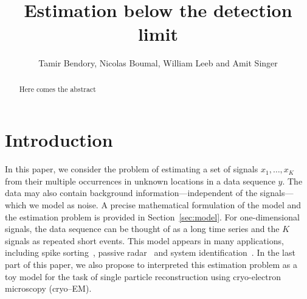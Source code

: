\documentclass[english,11pt]{article}
\newcommand{\TODO}[1]{{\color{red}{[#1]}}}
\numberwithin{equation}{section}
\theoremstyle{plain}
\theoremstyle{definition}
\theoremstyle{remark}
\theoremstyle{plain}
\theoremstyle{remark}
\theoremstyle{plain}
\theoremstyle{plain}
\begin{document}
\title{Estimation below the detection limit}


\author{Tamir Bendory, Nicolas Boumal, William Leeb and Amit Singer}
\maketitle

\begin{abstract}
	Here comes the abstract
\end{abstract}

\section{Introduction}

In this paper, we consider the problem of estimating a set of signals $x_1,\ldots,x_K$ from their multiple occurrences in unknown  locations in a data sequence $y$\TODO{This is the most important sentence of the paper, we need to polish it up}. The data may also contain background information---independent of the signals---which we model as noise.
A precise mathematical formulation of the model and the estimation problem is provided in Section~\ref{sec:model}.
For one-dimensional signals, the data sequence can be thought of as a 
long time series and the $K$ signals as repeated short events.  
This model appears in many applications, including spike sorting~\cite{lewicki1998review}, passive radar~\cite{gogineni2017passive} and system identification~\cite{ljung1998system}.
In the last part of this paper, we also propose to interpreted this estimation problem as a toy model for the task of single particle reconstruction using cryo-electron microscopy (cryo--EM). 
\end{document}

